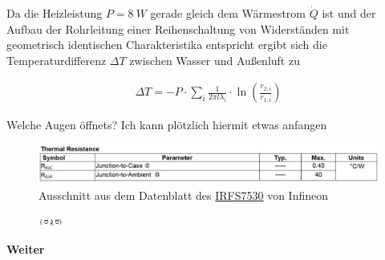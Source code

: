 Da die Heizleistung \(P = \SI{8}{W}\) gerade gleich dem Wärmestrom \(\dot{Q}\) ist und der Aufbau der Rohrleitung einer
Reihenschaltung von Widerständen mit geometrisch identischen Charakteristika entspricht ergibt sich die
Temperaturdifferenz \(\Delta T\) zwischen Wasser und Außenluft zu

\begin{gather}
    \Delta T = - P \cdot \sum_{i} \frac{1}{2 \pi l \lambda_i} \cdot \ln \left(\frac{r_{2,i}}{r_{1,i}}\right)
\end{gather}

Welche Augen öffnets? Ich kann plötzlich hiermit etwas anfangen

\begin{figure}[h]
    \centering
    \includegraphics[width=\textwidth]{entries/6/irfs7530.jpg}
    \caption{Ausschnitt aus dem Datenblatt des \textcolor{blue}{\href{https://www.infineon.com/dgdl/irfs7530-7ppbf.pdf?fileId=5546d462533600a40153563a9d1e21d8}{IRFS7530}} von Infineon}
    \label{fig:thermalResi}
\end{figure}
\vspace{40mm}
\begin{figure}[h]
    \centering
    \includegraphics[width=0.07\textwidth]{entries/6/ha.jpg}
\end{figure}
\newpage
\textbf{Weiter}

